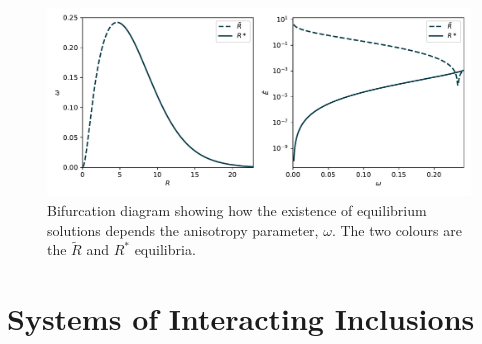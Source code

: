 \begin{figure}[h]
\centering
\includegraphics[width=12cm]{figures/3-elastic-figs/bifucation_di_energy.pdf}
\caption{Bifurcation diagram showing how the existence of equilibrium solutions depends the anisotropy parameter, $\omega$. The two colours are the $\tilde{R}$ and $R^*$ equilibria.}
\label{fig:Rbifur}
\end{figure}

\section{Systems of Interacting Inclusions}


